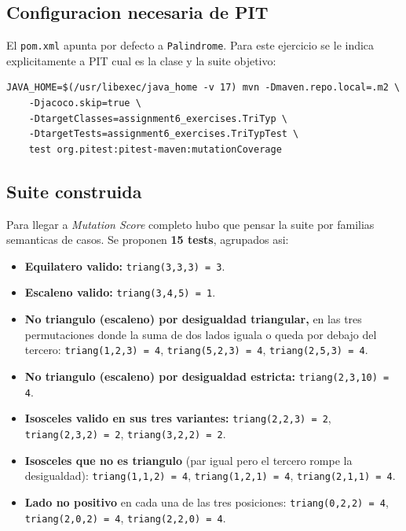 \documentclass[12pt,a4paper]{article}
\begin{document}
\subsection{Configuracion necesaria de PIT}

El \texttt{pom.xml} apunta por defecto a \texttt{Palindrome}. Para este ejercicio se le indica
explicitamente a PIT cual es la clase y la suite objetivo:

\begin{lstlisting}[style=codestyle]
JAVA_HOME=$(/usr/libexec/java_home -v 17) mvn -Dmaven.repo.local=.m2 \
    -Djacoco.skip=true \
    -DtargetClasses=assignment6_exercises.TriTyp \
    -DtargetTests=assignment6_exercises.TriTypTest \
    test org.pitest:pitest-maven:mutationCoverage
\end{lstlisting}

\subsection{Suite construida}

Para llegar a \emph{Mutation Score} completo hubo que pensar la suite por familias semanticas
de casos. Se proponen \textbf{15 tests}, agrupados asi:

\begin{itemize}
  \item \textbf{Equilatero valido:} \texttt{triang(3,3,3) = 3}.
  \item \textbf{Escaleno valido:} \texttt{triang(3,4,5) = 1}.
  \item \textbf{No triangulo (escaleno) por desigualdad triangular,} en las tres permutaciones
  donde la suma de dos lados iguala o queda por debajo del tercero:
  \texttt{triang(1,2,3) = 4}, \texttt{triang(5,2,3) = 4}, \texttt{triang(2,5,3) = 4}.
  \item \textbf{No triangulo (escaleno) por desigualdad estricta:}
  \texttt{triang(2,3,10) = 4}.
  \item \textbf{Isosceles valido en sus tres variantes:} \texttt{triang(2,2,3) = 2},
  \texttt{triang(2,3,2) = 2}, \texttt{triang(3,2,2) = 2}.
  \item \textbf{Isosceles que no es triangulo} (par igual pero el tercero rompe la
  desigualdad): \texttt{triang(1,1,2) = 4}, \texttt{triang(1,2,1) = 4},
  \texttt{triang(2,1,1) = 4}.
  \item \textbf{Lado no positivo} en cada una de las tres posiciones:
  \texttt{triang(0,2,2) = 4}, \texttt{triang(2,0,2) = 4}, \texttt{triang(2,2,0) = 4}.
\end{itemize}
\end{document}
